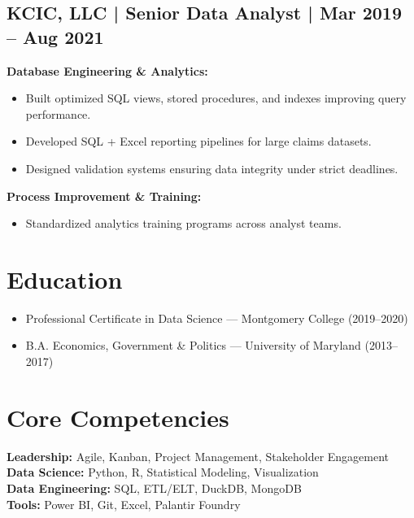 \documentclass{article}%
\begin{document}
\subsection{KCIC, LLC | Senior Data Analyst | Mar 2019 – Aug 2021}%
\label{subsec:KCIC,LLC|SeniorDataAnalyst|Mar2019Aug2021}%
\textbf{Database Engineering & Analytics:}\\%
\begin{itemize}%
\item Built optimized SQL views, stored procedures, and indexes improving query performance.%
\item Developed SQL + Excel reporting pipelines for large claims datasets.%
\item Designed validation systems ensuring data integrity under strict deadlines.%
\end{itemize}%
\textbf{Process Improvement & Training:}\\%
\begin{itemize}%
\item Standardized analytics training programs across analyst teams.%
\end{itemize}

%
\section{Education}%
\label{sec:Education}%
\begin{itemize}%
\item Professional Certificate in Data Science — Montgomery College (2019–2020)%
\item B.A. Economics, Government & Politics — University of Maryland (2013–2017)%
\end{itemize}

%
\section{Core Competencies}%
\label{sec:CoreCompetencies}%
\textbf{Leadership: } Agile, Kanban, Project Management, Stakeholder Engagement\\%
\textbf{Data Science: } Python, R, Statistical Modeling, Visualization\\%
\textbf{Data Engineering: } SQL, ETL/ELT, DuckDB, MongoDB\\%
\textbf{Tools: } Power BI, Git, Excel, Palantir Foundry\\

%
\end{document}
